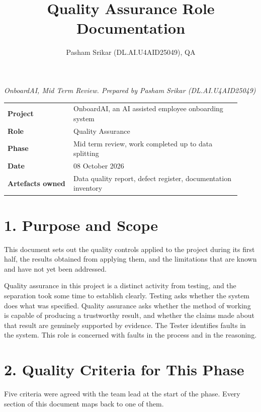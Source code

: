 \documentclass[11pt,a4paper]{article}
\begin{document}
\title{\textbf{Quality Assurance Role Documentation}}
\author{Pasham Srikar (DL.AI.U4AID25049), QA}
\date{}
\maketitle

\begin{center}\itshape OnboardAI, Mid Term Review. Prepared by Pasham Srikar (DL.AI.U4AID25049)\end{center}

\begin{tabular}{p{0.26\linewidth}p{0.66\linewidth}}
\toprule
\textbf{Project} & OnboardAI, an AI assisted employee onboarding system \\
\textbf{Role} & Quality Assurance \\
\textbf{Phase} & Mid term review, work completed up to data splitting \\
\textbf{Date} & 08 October 2026 \\
\textbf{Artefacts owned} & Data quality report, defect register, documentation inventory \\
\bottomrule
\end{tabular}

\section{1. Purpose and Scope}
This document sets out the quality controls applied to the project during its first half, the results obtained from applying them, and the limitations that are known and have not yet been addressed.

Quality assurance in this project is a distinct activity from testing, and the separation took some time to establish clearly. Testing asks whether the system does what was specified. Quality assurance asks whether the method of working is capable of producing a trustworthy result, and whether the claims made about that result are genuinely supported by evidence. The Tester identifies faults in the system. This role is concerned with faults in the process and in the reasoning.

\section{2. Quality Criteria for This Phase}
Five criteria were agreed with the team lead at the start of the phase. Every section of this document maps back to one of them.
\end{document}
